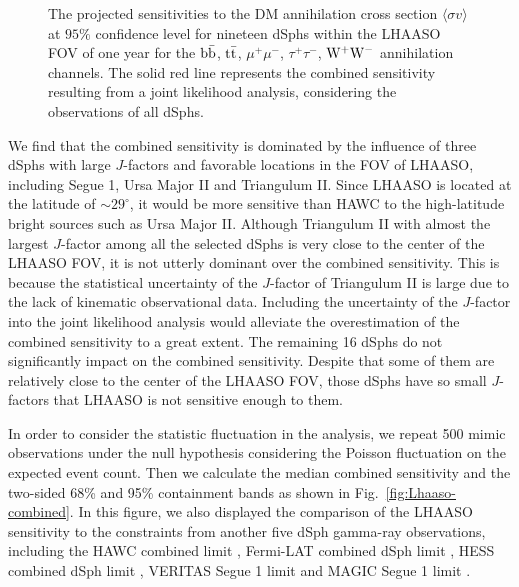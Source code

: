 \documentclass[12pt,aps,prd,amsmath,amssymb,showpacs,floats,floatfix,nofootinbib]{revtex4-1}
\begin{document}
\begin{figure}[!htbp]
\caption{The projected sensitivities to the DM annihilation cross section $\langle\sigma v\rangle$ at $95\%$ confidence level for nineteen dSphs within the LHAASO FOV of one year for the $\rm b\bar{b}$, $\rm t\bar{t}$, $\mu^{+}\mu^{-}$, $\tau^+\tau^-$, $\rm W^+W^-$ annihilation channels. The solid red line represents the combined sensitivity resulting from a joint likelihood analysis, considering the observations of all dSphs.}
\label{fig:Lhaaso-separate}
\end{figure}

We find that the combined sensitivity is dominated by the influence of three dSphs with large $J$-factors and favorable locations in the FOV of LHAASO, including Segue 1, Ursa Major II and Triangulum II. Since LHAASO is located at the latitude of $\sim29^{\circ}$, it would be more sensitive than HAWC to the high-latitude bright sources such as Ursa Major II. Although Triangulum II with almost the largest $J$-factor among all the selected dSphs is very close to the center of the LHAASO FOV, it is not utterly dominant over the combined sensitivity. This is because the statistical uncertainty of the $J$-factor of Triangulum II is large due to the lack of kinematic observational data. Including the uncertainty of the $J$-factor into the joint likelihood analysis would alleviate the overestimation of the combined sensitivity to a great extent. The remaining 16 dSphs do not significantly impact on the combined sensitivity. Despite that some of them are relatively close to the center of the LHAASO FOV, those dSphs have so small $J$-factors that LHAASO is not sensitive enough to them.

In order to consider the statistic fluctuation in the analysis, we repeat 500 mimic observations under the null hypothesis considering the Poisson fluctuation on the expected event count. Then we calculate the median combined sensitivity and the two-sided 68\% and 95\% containment bands as shown in Fig.~\ref{fig:Lhaaso-combined}.
In this figure, we also displayed the comparison of the LHAASO sensitivity to the constraints from another five dSph gamma-ray observations, including the HAWC combined limit \cite{Albert:2017vtb}, Fermi-LAT combined dSph limit \cite{Ackermann:2013yva}, HESS combined dSph limit \cite{Abramowski:2014tra}, VERITAS Segue 1 limit \cite{Aliu:2012ga} and MAGIC Segue 1 limit \cite{Ahnen:2016qkx}.
\end{document}
